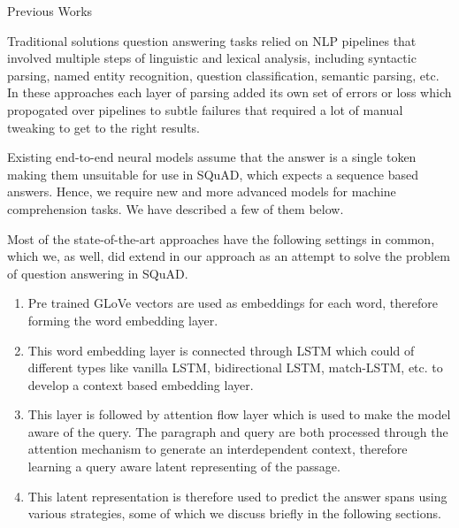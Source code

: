 \documentclass{article}
\begin{document}
\begin{psection}{Previous Works}

	Traditional solutions question answering tasks relied on NLP pipelines that involved multiple steps of linguistic and lexical analysis, including syntactic parsing, named entity recognition, question classification, semantic parsing, etc.
	In these approaches each layer of parsing added its own set of errors or loss which propogated over pipelines to subtle failures that required a lot of manual tweaking to get to the right results.

	Existing end-to-end neural models assume that the answer is a single token making them unsuitable for use in SQuAD, which expects a sequence based answers. Hence, we require new and more advanced models for machine comprehension tasks. We have described a few of them below.

	Most of the state-of-the-art approaches have the following settings in common, which we, as well, did extend in our approach as an attempt to solve the problem of question answering in SQuAD.

	\begin{enumerate}
		\item Pre trained GLoVe \citep{glove} vectors are used as embeddings for each word, therefore forming the word embedding layer.

		\item This word embedding layer is connected through LSTM which could of different types like vanilla LSTM, bidirectional LSTM, match-LSTM, etc. to develop a context based embedding layer.

		\item \sloppy
		    This layer is followed by attention flow layer which is used to make the model aware of the query.
			The paragraph and query are both processed through the attention mechanism to generate an interdependent context, therefore learning a query aware latent representing of the passage.

		\item This latent representation is therefore used to predict the answer spans using various strategies, some of which we discuss briefly in the following sections.
	\end{enumerate}




\end{psection}
\end{document}
